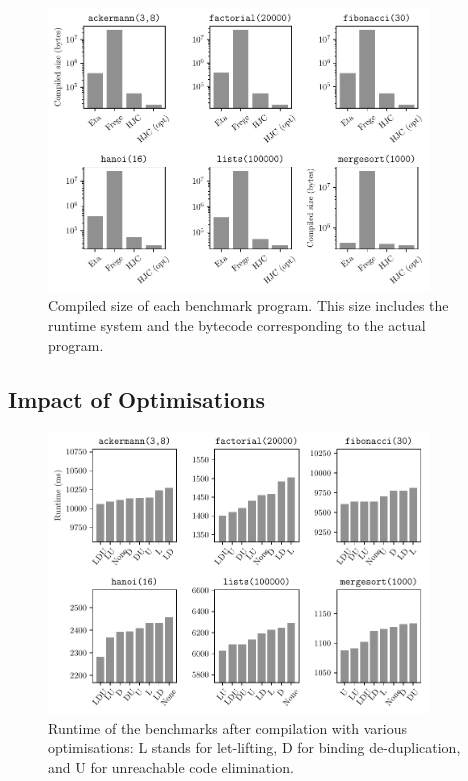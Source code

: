\documentclass[dissertation.tex]{subfiles}
\begin{document}
{{        \begin{figure}[H]
            \centering
            \captionsetup{width=0.8\textwidth}
            \includegraphics[width=0.9\textwidth]{graphs/size.pdf}
            \caption{Compiled size of each benchmark program. This size includes the runtime system and the bytecode corresponding to the actual program.}
            \label{fig:executable-size}
        \end{figure}

    }
    \subsection{Impact of Optimisations}
    {


        \begin{figure}[H]
            \centering
            \captionsetup{width=0.8\textwidth}
            \includegraphics[width=0.9\textwidth]{graphs/perf_by_opt.pdf}
            \caption{Runtime of the benchmarks after compilation with various optimisations: L stands for let-lifting, D for binding de-duplication, and U for unreachable code elimination.}
            \label{fig:opt-perf}
        \end{figure}

    }
}
\end{document}
